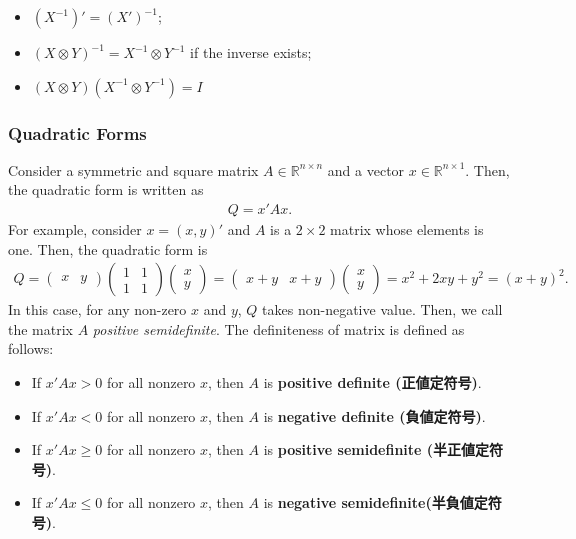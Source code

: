 \documentclass[
  12pt,
]{article}
\providecommand{\tightlist}{%
  \setlength{\itemsep}{0pt}\setlength{\parskip}{0pt}}
\begin{document}
\begin{itemize}
\tightlist
\item
  \((X^{-1})' = (X')^{-1}\);
\item
  \((X \otimes Y)^{-1} = X^{-1} \otimes Y^{-1}\) if the inverse exists;
\item
  \((X \otimes Y)(X^{-1} \otimes Y^{-1}) = I\)
\end{itemize}

\hypertarget{quadratic-forms}{%
\subsubsection{Quadratic Forms}\label{quadratic-forms}}

Consider a symmetric and square matrix \(A \in \mathbb{R}^{n \times n}\) and a vector \(x \in \mathbb{R}^{n \times 1}\).
Then, the quadratic form is written as
\begin{align*}
  Q = x' A x.
\end{align*}
For example, consider \(x = (x, y)'\) and \(A\) is a \(2 \times 2\) matrix whose elements is one.
Then, the quadratic form is
\begin{align*}
  Q 
  =
  \begin{pmatrix} x & y \end{pmatrix}
  \begin{pmatrix} 1 & 1 \\ 1 & 1 \end{pmatrix}
  \begin{pmatrix} x \\ y \end{pmatrix}
  =
  \begin{pmatrix} x+y & x+y \end{pmatrix}
  \begin{pmatrix} x \\ y \end{pmatrix}  
  = x^2 + 2xy + y^2 = (x + y)^2.
\end{align*}
In this case, for any non-zero \(x\) and \(y\), \(Q\) takes non-negative value.
Then, we call the matrix \(A\) \emph{positive semidefinite}.
The definiteness of matrix is defined as follows:

\begin{itemize}
\tightlist
\item
  If \(x'Ax > 0\) for all nonzero \(x\), then \(A\) is \textbf{positive definite (正値定符号)}.
\item
  If \(x'Ax < 0\) for all nonzero \(x\), then \(A\) is \textbf{negative definite (負値定符号)}.
\item
  If \(x'Ax \ge 0\) for all nonzero \(x\), then \(A\) is \textbf{positive semidefinite (半正値定符号)}.
\item
  If \(x'Ax \le 0\) for all nonzero \(x\), then \(A\) is \textbf{negative semidefinite(半負値定符号)}.
\end{itemize}
\end{document}
